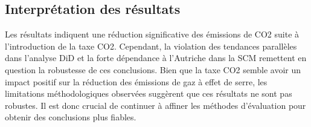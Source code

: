 \subsection{Interprétation des résultats}

Les résultats indiquent une réduction significative des émissions de CO2 suite à l'introduction de la taxe CO2. Cependant, la violation des tendances parallèles dans l'analyse DiD et la forte dépendance à l'Autriche dans la SCM remettent en question la robustesse de ces conclusions. Bien que la taxe CO2 semble avoir un impact positif sur la réduction des émissions de gaz à effet de serre, les limitations méthodologiques observées suggèrent que ces résultats ne sont pas robustes. Il est donc crucial de continuer à affiner les méthodes d'évaluation pour obtenir des conclusions plus fiables.




